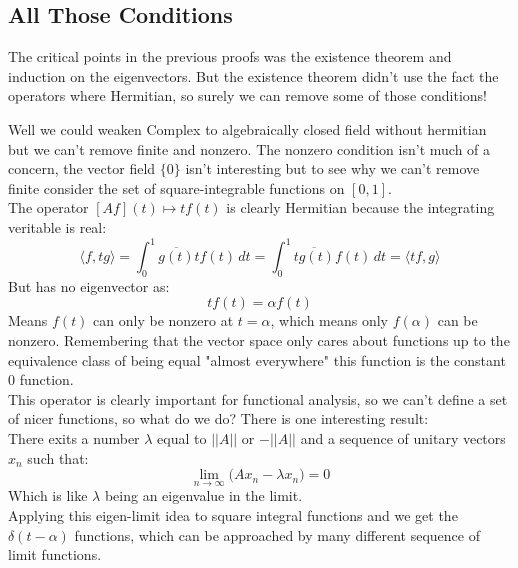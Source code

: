 \subsection{All Those Conditions}
The critical points in the previous proofs was the existence theorem and induction on the eigenvectors.
But the existence theorem didn't use the fact the operators where Hermitian,
so surely we can remove some of those conditions!

Well we could weaken Complex to algebraically closed field without hermitian but we can't remove finite and nonzero.
The nonzero condition isn't much of a concern, 
the vector field $\{0\}$ isn't interesting but to see why we can't remove finite consider the set of square-integrable functions on $[0,1]$.
\\

The operator $[Af](t) \mapsto tf(t)$ is clearly Hermitian because the integrating veritable is real:
\[
	\langle f,tg\rangle = \int_0^1\overline{g(t)}tf(t)\,dt = \int_0^1\overline{tg(t)}f(t)\,dt = \langle tf,g\rangle
\]
But has no eigenvector as:
\[tf(t)=\alpha f(t)\]
Means $f(t)$ can only be nonzero at $t=\alpha$,
which means only $f(\alpha)$ can be nonzero.
Remembering that the vector space only cares about functions up to the equivalence class of being equal "almost everywhere" this function is the constant $0$ function.
\\

This operator is clearly important for functional analysis,
so we can't define a set of nicer functions,
so what do we do?
There is one interesting result:
\\

There exits a number $\lambda$ equal to $||A||$ or $-||A||$ and a sequence of unitary vectors $x_n$ such that:
\[\lim_{n\rightarrow\infty}\big(Ax_n-\lambda x_n\big) = 0\]
Which is like $\lambda$ being an eigenvalue in the limit.
\\

Applying this eigen-limit idea to square integral functions and we get the $\delta(t-\alpha)$ functions,
which can be approached by many different sequence of limit functions.
